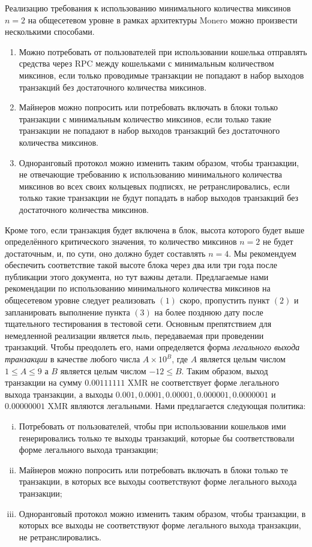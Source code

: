 \documentclass{mrl}
\begin{document}
Реализацию требования к использованию минимального количества миксинов $n=2$ на общесетевом уровне в рамках архитектуры Monero можно произвести несколькими способами.
\begin{enumerate}[(1)]
\item Можно потребовать от пользователей при использовании кошелька отправлять средства через RPC между кошельками с минимальным количеством миксинов, если только проводимые транзакции не попадают в набор выходов транзакций без достаточного количества миксинов.
\item Майнеров можно попросить или потребовать включать в блоки только транзакции с минимальным количество миксинов, если только такие транзакции не попадают в набор выходов транзакций без достаточного количества миксинов.
\item Одноранговый протокол можно изменить таким образом, чтобы транзакции, не отвечающие требованию к использованию минимального количества миксинов во всех своих кольцевых подписях, не ретранслировались, если только такие транзакции не будут попадать в набор выходов транзакций без достаточного количества миксинов.
\end{enumerate}

Кроме того, если транзакция будет включена в блок, высота которого будет выше определённого критического значения, то количество миксинов $n=2$ не будет достаточным, и, по сути, оно должно будет составлять $n=4$. Мы рекомендуем обеспечить соответствие такой высоте блока через два или три года после публикации этого документа, но тут важны детали. Предлагаемые нами рекомендации по использованию минимального количества миксинов на общесетевом уровне следует реализовать $(1)$ скоро, пропустить пункт $(2)$ и запланировать выполнение пункта $(3)$ на более позднюю дату после тщательного тестирования в тестовой сети. Основным препятствием для немедленной реализации является \textit{пыль}, передаваемая при проведении транзакций. Чтобы преодолеть его, нами определяется форма \textit{легального выхода транзакции} в качестве любого числа $A \times 10^{B}$, где $A$ является целым числом $1 \leq A \leq 9$ а $B$ является целым числом $-12 \leq B$. Таким образом, выход транзакции на сумму $0.00111111$ XMR не соответствует форме легального выхода транзакции, а выходы $0.001, 0.0001, 0.00001, 0.000001, 0.0000001$ и $0.00000001$ XMR являются легальными. Нами предлагается следующая политика:

\begin{enumerate}[(i)]
\item Потребовать от пользователей, чтобы при использовании кошельков ими генерировались только те выходы транзакций, которые бы соответствовали форме легального выхода транзакции;
\item Майнеров можно попросить или потребовать включать в блоки только те транзакции, в которых все выходы соответствуют форме легального выхода транзакции;
\item Одноранговый протокол можно изменить таким образом, чтобы транзакции, в которых все выходы не соответствуют форме легального выхода транзакции, не ретранслировались.
\end{enumerate}
\end{document}
